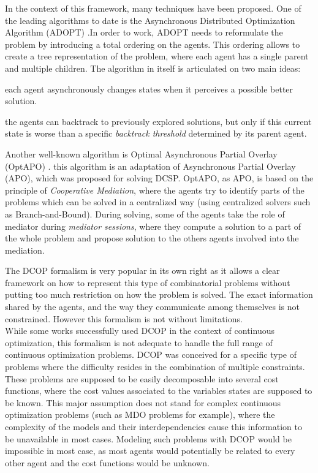 In the context of this framework, many techniques have been proposed. One of the leading algorithms to date is the Asynchronous Distributed Optimization Algorithm (ADOPT) \cite{Modi06adopt:asynchronous}.In order to work, ADOPT needs to reformulate the problem by introducing a total ordering on the agents. This ordering allows to create a tree representation of the problem, where each agent has a single parent and multiple children. The algorithm in itself is articulated on two main ideas:

\begin{compactitem}
\item each agent asynchronously changes states when it perceives a possible better solution.
\item the agents can backtrack to previously explored solutions, but only if this current state is worse than a specific \emph{backtrack threshold} determined by its parent agent.
\end{compactitem}

Another well-known algorithm is Optimal Asynchronous Partial Overlay (OptAPO) \cite{Mailler-355}. this algorithm is an adaptation of Asynchronous Partial Overlay (APO), which was proposed for solving DCSP. OptAPO, as APO, is based on the principle of \emph{Cooperative Mediation}, where the agents try to identify parts of the problems which can be solved in a centralized way (using centralized solvers such as Branch-and-Bound). During solving, some of the agents take the role of mediator during \emph{mediator sessions}, where they compute a solution to a part of the whole problem and propose solution to the others agents involved into the mediation.

The DCOP formalism is very popular in its own right as it allows a clear framework on how to represent this type of combinatorial problems without putting too much restriction on how the problem  is solved. The exact information shared by the agents, and the way they communicate among themselves is not constrained. However this formalism is not without limitations.\\
While some works successfully used DCOP in the context of continuous optimization\cite{stranders2009decentralised}, this formalism is not adequate to handle the full range of continuous optimization problems. DCOP was conceived for a specific type of problems where the difficulty resides in the combination of multiple constraints. These problems are supposed to be easily decomposable into several cost functions, where the cost values associated to the variables states are supposed to be known. This major assumption does not stand for complex continuous optimization problems (such as MDO problems for example), where the complexity of the models and their interdependencies cause this information to be unavailable in most cases. Modeling such problems with DCOP would be impossible in most case, as most agents would potentially be related to every other agent and the cost functions would be unknown.


